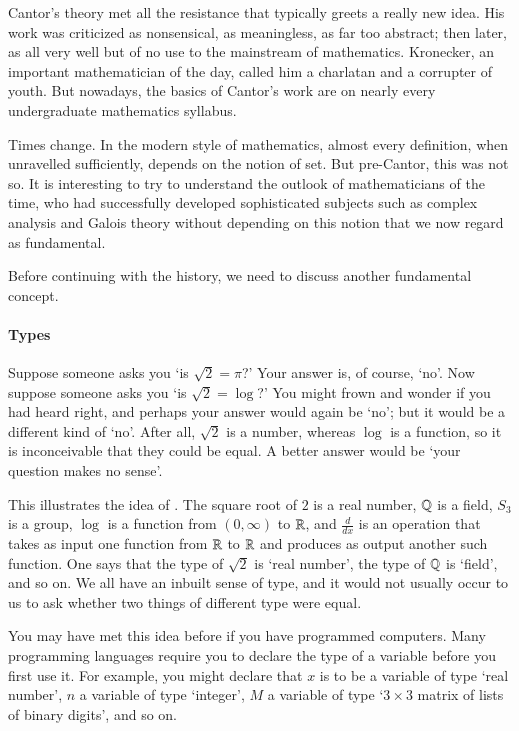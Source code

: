 Cantor's theory met all the resistance that typically greets a really new
idea.  His work was criticized as nonsensical, as meaningless, as far too
abstract; then later, as all very well but of no use to the mainstream of
mathematics.  Kronecker,%
%
%
an important mathematician of the day, called him a charlatan and a
corrupter of youth.  But nowadays, the basics of Cantor's work are on
nearly every undergraduate mathematics syllabus.

Times change.  In the modern style of mathematics, almost every definition,
when unravelled sufficiently, depends on the notion of set.  But
pre-Cantor, this was not so.  It is interesting to try to understand the
outlook of mathematicians of the time, who had successfully developed
sophisticated subjects such as complex analysis and Galois theory without
depending on this notion that we now regard as fundamental.

Before continuing with the history, we need to discuss another fundamental
concept.

\paragraph*{Types}
%
%
Suppose someone asks you `is $\sqrt{2} = \pi$?'  Your answer is, of course,
`no'.  Now suppose someone asks you `is $\sqrt{2} = \log$?'  You might
frown and wonder if you had heard right, and perhaps your answer would
again be `no'; but it would be a different kind of `no'.  After all,
$\sqrt{2}$ is a number, whereas $\log$ is a function, so it is
inconceivable that they could be equal.  A better answer would be `your
question makes no sense'.

This illustrates the idea of .  The square root of $2$ is a
real number, $\mathbb{Q}$ is a field, $S_3$ is a group, $\log$ is a
function from $(0, \infty)$ to $\mathbb{R}$, and $\frac{d}{dx}$ is an operation
that takes as input one function from $\mathbb{R}$ to $\mathbb{R}$ and produces as
output another such function.  One says that the type of $\sqrt{2}$ is
`real number', the type of $\mathbb{Q}$ is `field', and so on.  We all have
an inbuilt sense of type, and it would not usually occur to us to ask
whether two things of different type were equal.

You may have met this idea before if you have programmed computers.%
%
%
Many programming languages require you to declare the type of a variable
before you first use it.  For example, you might declare that $x$ is to be
a variable of type `real number', $n$ a variable of type `integer', $M$ a
variable of type `$3 \times 3$ matrix of lists of binary digits', and so
on.

